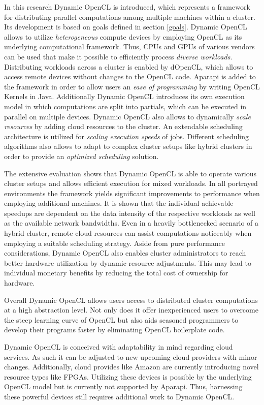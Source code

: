 In this research Dynamic OpenCL is introduced, which represents a framework for distributing parallel computations among multiple machines within a cluster. Its development is based on goals defined in section \ref{goals}. Dynamic OpenCL allows to utilize \textit{heterogeneous} compute devices by employing OpenCL as its underlying computational framework. Thus, CPUs and GPUs of various vendors can be used that make it possible to efficiently process \textit{diverse workloads}. Distributing workloads across a cluster is enabled by dOpenCL, which allows to access remote devices without changes to the OpenCL code. Aparapi is added to the framework in order to allow users an \textit{ease of programming} by writing OpenCL Kernels in Java. Additionally Dynamic OpenCL introduces its own execution model in which computations are split into partials, which can be executed in parallel on multiple devices. Dynamic OpenCL also allows to dynamically \textit{scale resources} by adding cloud resources to the cluster. An extendable scheduling architecture is utilized for \textit{scaling execution speeds} of jobs. Different scheduling algorithms also allows to adapt to complex cluster setups like hybrid clusters in order to provide an \textit{optimized scheduling} solution.

The extensive evaluation shows that Dynamic OpenCL is able to operate various cluster setups and allows efficient execution for mixed workloads. In all portrayed environments the framework yields significant improvements to performance when employing additional machines. It is shown that the individual achievable speedups are dependent on the data intensity of the respective workloads as well as the available network bandwidths. Even in a heavily bottlenecked scenario of a hybrid cluster, remote cloud resources can assist computations noticeably when employing a suitable scheduling strategy. Aside from pure performance considerations, Dynamic OpenCL also enables cluster administrators to reach better hardware utilization by dynamic resource adjustments. This may lead to individual monetary benefits by reducing the total cost of ownership for hardware.

Overall Dynamic OpenCL allows users access to distributed cluster computations at a high abstraction level. Not only does it offer inexperienced users to overcome the steep learning curve of OpenCL but also aids seasoned programmers to develop their programs faster by eliminating OpenCL boilerplate code.

Dynamic OpenCL is conceived with adaptability in mind regarding cloud services. As such it can be adjusted to new upcoming cloud providers with minor changes. Additionally, cloud provides like Amazon are currently introducing novel resource types like FPGAs\cite{amazon_fpga}. Utilizing these devices is possible by the underlying OpenCL model but is currently not supported by Aparapi. Thus, harnessing these powerful devices still requires additional work to Dynamic OpenCL.

